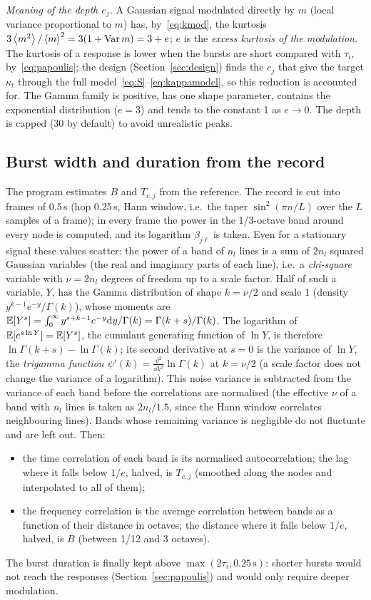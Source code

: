 \emph{Meaning of the depth $e_j$.} A Gaussian signal modulated directly by $m$ (local variance
proportional to $m$) has, by~\eqref{eq:kmod}, the kurtosis $3\left\langle m^2 \right\rangle/\left\langle m \right\rangle^2 =
3(1+\operatorname{Var} m) = 3 + e$; $e$ is the \emph{excess kurtosis of the modulation}. The kurtosis of a
response is lower when the bursts are short compared with $\tau_i$, by~\eqref{eq:papoulis}; the design
(Section~\ref{sec:design}) finds the $e_j$ that give the target $\kappa_t$ through the full
model~\eqref{eq:S}--\eqref{eq:kappamodel}, so this reduction is accounted for. The Gamma family is
positive, has one shape parameter, contains the exponential distribution ($e=3$) and tends to the
constant 1 as $e\to0$. The depth is capped (30 by default) to avoid unrealistic peaks.

\subsection{Burst width and duration from the record}\label{sec:structure}

The program estimates $B$ and $T_{c,j}$ from the reference. The record is cut into frames of 0.5\,s
(hop 0.25\,s, Hann window, i.e.\ the taper $\sin^2(\pi n/L)$ over the $L$ samples of a frame); in every
frame the power in the 1/3-octave band around every node is computed, and its logarithm
$\beta_{j\ell}$ is taken. Even for a stationary signal these values scatter: the power of a band
of $n_l$ lines is a sum of $2n_l$ squared Gaussian variables (the real and imaginary parts of each
line), i.e.\ a \emph{chi-square} variable with $\nu = 2n_l$ degrees of freedom up to a scale factor.
Half of such a variable, $Y$, has the Gamma distribution of shape $k = \nu/2$ and scale 1 (density
$y^{k-1}e^{-y}/\Gamma(k)$), whose moments are $\mathbb{E}[Y^s] = \int_0^\infty y^{s+k-1}e^{-y}\mathrm{d} y/\Gamma(k) =
\Gamma(k+s)/\Gamma(k)$. The logarithm of $\mathbb{E}[e^{s\ln Y}] = \mathbb{E}[Y^s]$, the cumulant generating function
of $\ln Y$, is therefore $\ln\Gamma(k+s)-\ln\Gamma(k)$; its second derivative at $s=0$ is the
variance of $\ln Y$, the \emph{trigamma function} $\psi'(k) = \frac{\dd^2}{\dd k^2}\ln\Gamma(k)$ at
$k=\nu/2$ (a scale factor does not change the variance of a logarithm). This noise variance is subtracted from the variance of each band before the
correlations are normalised (the effective $\nu$ of a band with $n_l$ lines is taken as $2n_l/1.5$,
since the Hann window correlates neighbouring lines). Bands whose remaining variance is negligible
do not fluctuate and are left out. Then:
\begin{itemize}[nosep]
\item the time correlation of each band is its normalised autocorrelation; the lag where it falls
below $1/e$, halved, is $T_{c,j}$ (smoothed along the nodes and interpolated to all of them);
\item the frequency correlation is the average correlation between bands as a function of their
distance in octaves; the distance where it falls below $1/e$, halved, is $B$ (between 1/12 and 3
octaves).
\end{itemize}
The burst duration is finally kept above $\max(2\tau_i, 0.25\,\mathrm{s})$: shorter bursts would not
reach the responses (Section~\ref{sec:papoulis}) and would only require deeper modulation.

